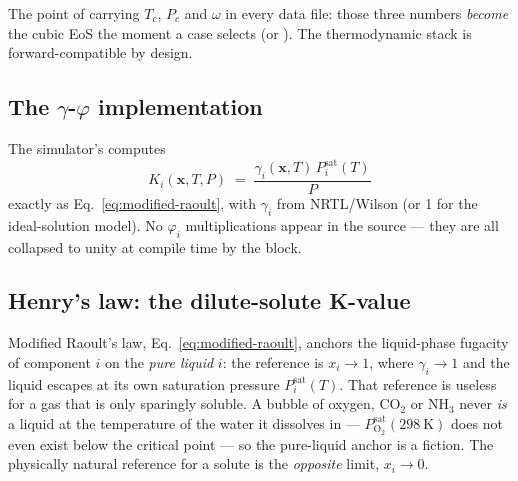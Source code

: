 \documentclass[11pt,a4paper]{article}
\newcommand{\Psat}{P^{\mathrm{sat}}}
\begin{document}
The point of carrying $T_c$, $P_c$ and $\omega$ in every data file:
those three numbers \emph{become} the cubic EoS the moment a case
selects  (or ).  The thermodynamic stack
is forward-compatible by design.

\subsection{The $\gamma$-$\varphi$ implementation}

The simulator's  computes
\begin{equation}
   K_i(\mathbf{x}, T, P)
   \;=\; \frac{\gamma_i(\mathbf{x}, T)\,P_i^{\mathrm{sat}}(T)}
              {P}
\end{equation}
exactly as Eq.~\eqref{eq:modified-raoult}, with $\gamma_i$ from
NRTL/Wilson (or 1 for the ideal-solution model).  No
$\varphi_i$ multiplications appear in the source --- they are all
collapsed to unity at compile time by the  block.

\subsection{Henry's law: the dilute-solute K-value}\label{sec:henry}

Modified Raoult's law, Eq.~\eqref{eq:modified-raoult}, anchors the
liquid-phase fugacity of component $i$ on the \emph{pure liquid} $i$:
the reference is $x_i \to 1$, where $\gamma_i \to 1$ and the liquid
escapes at its own saturation pressure $\Psat_i(T)$.  That reference
is useless for a gas that is only sparingly soluble.  A bubble of
oxygen, $\mathrm{CO_2}$ or $\mathrm{NH_3}$ never \emph{is} a liquid at
the temperature of the water it dissolves in --- $\Psat_{\mathrm{O_2}}
(298~\mathrm K)$ does not even exist below the critical point --- so
the pure-liquid anchor is a fiction.  The physically natural reference
for a solute is the \emph{opposite} limit, $x_i \to 0$.
\end{document}
